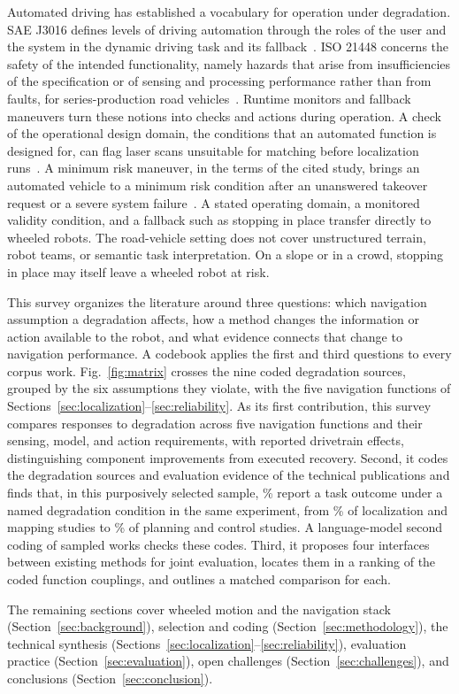 

Automated driving has established a vocabulary for operation under degradation. SAE J3016 defines levels of driving automation through the roles of the user and the system in the dynamic driving task and its fallback~\cite{B_DrivingAutomation2021}. ISO 21448 concerns the safety of the intended functionality, namely hazards that arise from insufficiencies of the specification or of sensing and processing performance rather than from faults, for series-production road vehicles~\cite{B_SOTIF2022}. Runtime monitors and fallback maneuvers turn these notions into checks and actions during operation. A check of the operational design domain, the conditions that an automated function is designed for, can flag laser scans unsuitable for matching before localization runs~\cite{B_ODDMonitoring2021}. A minimum risk maneuver, in the terms of the cited study, brings an automated vehicle to a minimum risk condition after an unanswered takeover request or a severe system failure~\cite{B_MRMFallback2025}. A stated operating domain, a monitored validity condition, and a fallback such as stopping in place transfer directly to wheeled robots. The road-vehicle setting does not cover unstructured terrain, robot teams, or semantic task interpretation. On a slope or in a crowd, stopping in place may itself leave a wheeled robot at risk.

This survey organizes the literature around three questions: which navigation assumption a degradation affects, how a method changes the information or action available to the robot, and what evidence connects that change to navigation performance. A codebook applies the first and third questions to every corpus work. Fig.~\ref{fig:matrix} crosses the nine coded degradation sources, grouped by the six assumptions they violate, with the five navigation functions of Sections~\ref{sec:localization}--\ref{sec:reliability}. As its first contribution, this survey compares responses to degradation across five navigation functions and their sensing, model, and action requirements, with reported drivetrain effects, distinguishing component improvements from executed recovery. Second, it codes the degradation sources and evaluation evidence of the \CoreCount{} technical publications and finds that, in this purposively selected sample, \DegTaskShare\% report a task outcome under a named degradation condition in the same experiment, from \LocSameShare\% of localization and mapping studies to \PlnSameShare\% of planning and control studies. A language-model second coding of \SampleCount{} sampled works checks these codes. Third, it proposes four interfaces between existing methods for joint evaluation, locates them in a ranking of the coded function couplings, and outlines a matched comparison for each.

The remaining sections cover wheeled motion and the navigation stack (Section~\ref{sec:background}), selection and coding (Section~\ref{sec:methodology}), the technical synthesis (Sections~\ref{sec:localization}--\ref{sec:reliability}), evaluation practice (Section~\ref{sec:evaluation}), open challenges (Section~\ref{sec:challenges}), and conclusions (Section~\ref{sec:conclusion}).
